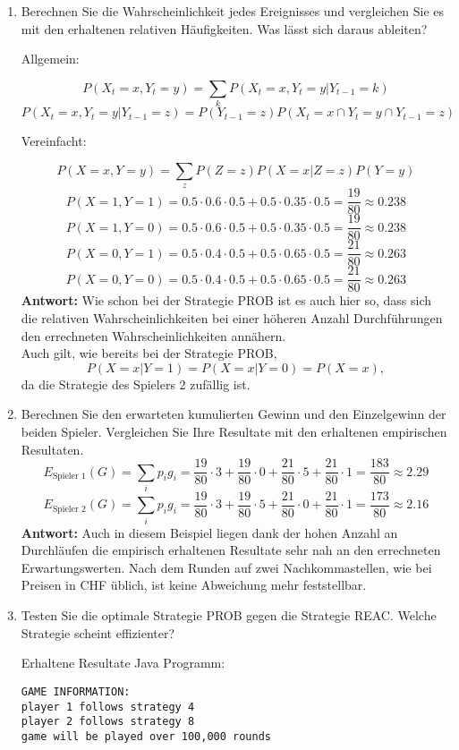 \documentclass[12pt,a4paper]{article}
\begin{document}
\begin{enumerate}
\begin{enumerate}
\item Berechnen Sie die Wahrscheinlichkeit jedes Ereignisses und vergleichen Sie es mit den erhaltenen relativen Häufigkeiten.
Was lässt sich daraus ableiten?
\begin{center}Allgemein:\end{center}
$$P(X_t = x, Y_t = y) = \sum_{k} P(X_t = x, Y_t = y | Y_{t-1} = k)$$
$$P(X_t = x, Y_t = y | Y_{t-1} = z) = P(Y_{t-1} = z) P(X_t = x \cap Y_t = y \cap Y_{t-1} = z)$$
\begin{center}Vereinfacht:\end{center}
$$P(X = x, Y = y) = \sum_{z} P(Z = z) P(X = x | Z = z) P(Y = y)$$
$$P(X = 1, Y = 1) = 0.5 \cdot 0.6 \cdot 0.5 + 0.5 \cdot 0.35 \cdot 0.5 = \frac{19}{80} \approx 0.238$$
$$P(X = 1, Y = 0) = 0.5 \cdot 0.6 \cdot 0.5 + 0.5 \cdot 0.35 \cdot 0.5 = \frac{19}{80} \approx 0.238$$
$$P(X = 0, Y = 1) = 0.5 \cdot 0.4 \cdot 0.5 + 0.5 \cdot 0.65 \cdot 0.5 = \frac{21}{80} \approx 0.263$$
$$P(X = 0, Y = 0) = 0.5 \cdot 0.4 \cdot 0.5 + 0.5 \cdot 0.65 \cdot 0.5 = \frac{21}{80} \approx 0.263$$
\textbf{Antwort:} Wie schon bei der Strategie PROB ist es auch hier so, dass sich die relativen Wahrscheinlichkeiten bei einer höheren Anzahl Durchführungen den errechneten Wahrscheinlichkeiten annähern.\\
Auch gilt, wie bereits bei der Strategie PROB, $$P(X = x|Y = 1) = P(X = x|Y = 0) = P(X = x),$$ da die Strategie des Spielers 2 zufällig ist.

\item Berechnen Sie den erwarteten kumulierten Gewinn und den Einzelgewinn der beiden Spieler.
Vergleichen Sie Ihre Resultate mit den erhaltenen empirischen Resultaten.
$$E_{\text{Spieler 1}}(G) = \sum_{i} p_i g_i = \frac{19}{80} \cdot 3 + \frac{19}{80} \cdot 0 + \frac{21}{80} \cdot 5 + \frac{21}{80} \cdot 1 = \frac{183}{80} \approx 2.29$$
$$E_{\text{Spieler 2}}(G) = \sum_{i} p_i g_i = \frac{19}{80} \cdot 3 + \frac{19}{80} \cdot 5 + \frac{21}{80} \cdot 0 + \frac{21}{80} \cdot 1 = \frac{173}{80} \approx 2.16$$
\textbf{Antwort:} Auch in diesem Beispiel liegen dank der hohen Anzahl an Durchläufen die empirisch erhaltenen Resultate sehr nah an den errechneten Erwartungswerten.
Nach dem Runden auf zwei Nachkommastellen, wie bei Preisen in CHF üblich, ist keine Abweichung mehr feststellbar.
\newpage

\item Testen Sie die optimale Strategie PROB gegen die Strategie REAC. Welche Strategie scheint effizienter?
\begin{center}Erhaltene Resultate Java Programm:\end{center}
\begin{verbatim}
GAME INFORMATION:
player 1 follows strategy 4
player 2 follows strategy 8
game will be played over 100,000 rounds


\end{verbatim}
\end{enumerate}
\end{enumerate}
\end{document}
